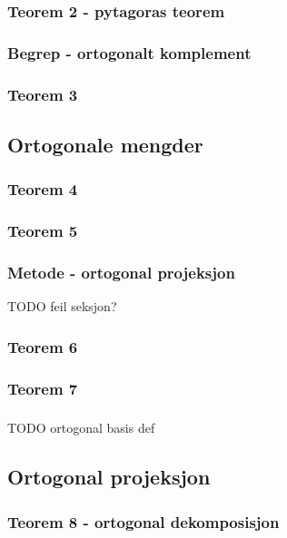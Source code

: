 \documentclass{article}
\begin{document}
      \subsubsection{Teorem 2 - pytagoras teorem}
        
      \subsubsection{Begrep - ortogonalt komplement}
        
      \subsubsection{Teorem 3}
        
    \subsection{Ortogonale mengder}
      \subsubsection{Teorem 4}
        
      \subsubsection{Teorem 5}
        
      \subsubsection{Metode - ortogonal projeksjon}
        
        TODO feil seksjon?
      \subsubsection{Teorem 6}
        
      \subsubsection{Teorem 7}
        
      \subsubsection{}
        TODO ortogonal basis def
    \subsection{Ortogonal projeksjon}
      \subsubsection{Teorem 8 - ortogonal dekomposisjon}
        
\end{document}
